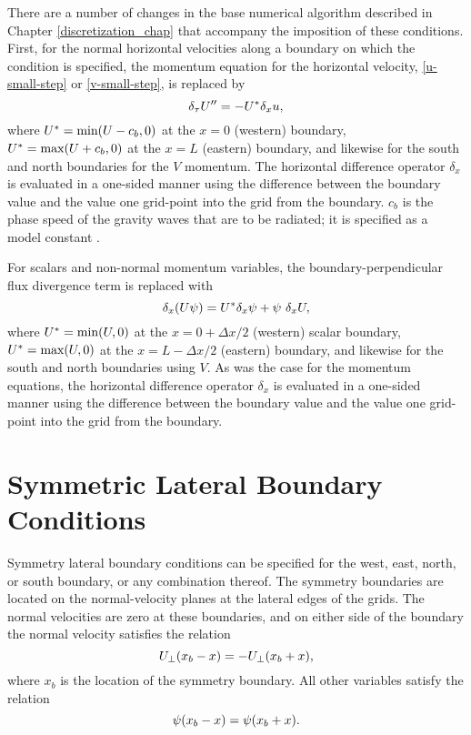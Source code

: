 There are a 
number of changes in the base numerical algorithm 
described in Chapter \ref{discretization_chap} 
that accompany the imposition of these
conditions.  First, for the normal horizontal velocities along
a boundary on which the condition is specified, the momentum
equation for the horizontal velocity, \eqref{u-small-step} or 
\eqref{v-small-step}, is replaced by
%
\begin{equation}
\delta_\tau U'' = - U^* \delta_x u,
\notag
\end{equation}
%
\noindent
where $U^* = \hbox{min}(U - c_b,0)$ at the $x = 0$ (western) boundary,
$U^* = \hbox{max}(U + c_b,0)$ at the $x = L$ (eastern) boundary, and
likewise for the south and north boundaries for the $V$ momentum.  The
horizontal difference operator $\delta_x$ is evaluated in a one-sided
manner using the difference between the boundary value and the
value one grid-point into the grid from the boundary.  $c_b$ is the phase
speed of the gravity waves that are to be radiated; it is specified
as a model constant 
\citep[for more details see][]{klemp_and_lilly78, klemp78}.

For scalars and non-normal momentum variables, the
boundary-perpendicular flux divergence term is replaced with
%
\begin{equation}
\delta_x (U\psi) = U^* \delta_x \psi + \psi \ \delta_x U,
\notag
\end{equation}
%
\noindent
where $U^* = \hbox{min}(U,0)$ at the $x = 0 + \Delta x/2$ (western)
scalar boundary,
$U^* = \hbox{max}(U,0)$ at the $x = L - \Delta x/2$ (eastern) boundary, and
likewise for the south and north boundaries using $V$.  As was the case
for the momentum equations, the
horizontal difference operator $\delta_x$ is evaluated in a one-sided
manner using the difference between the boundary value and the
value one grid-point into the grid from the boundary.

\section{Symmetric Lateral Boundary Conditions}

Symmetry lateral boundary conditions can be specified for the west,
east, north, or south boundary, or any combination thereof.  The
symmetry boundaries are located on the normal-velocity planes at the
lateral edges of the grids.  The normal velocities are zero at
these boundaries, and on either side of the boundary the normal 
velocity satisfies the relation
%
\begin{equation}
U_{\perp}(x_b - x) = - U_{\perp}(x_b + x),
\notag
\end{equation}
%
\noindent
where $x_b$ is the location of the symmetry boundary.
All other variables satisfy the relation
\begin{equation}
\psi(x_b - x) = \psi(x_b + x).
\notag
\end{equation}


